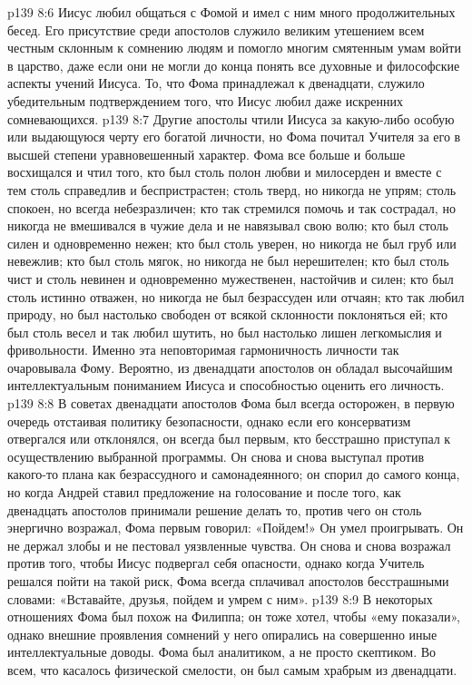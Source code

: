 \vs p139 8:6 Иисус любил общаться с Фомой и имел с ним много продолжительных бесед. Его присутствие среди апостолов служило великим утешением всем честным склонным к сомнению людям и помогло многим смятенным умам войти в царство, даже если они не могли до конца понять все духовные и философские аспекты учений Иисуса. То, что Фома принадлежал к двенадцати, служило убедительным подтверждением того, что Иисус любил даже искренних сомневающихся.
\vs p139 8:7 \pc Другие апостолы чтили Иисуса за какую\hyp{}либо особую или выдающуюся черту его богатой личности, но Фома почитал Учителя за его в высшей степени уравновешенный характер. Фома все больше и больше восхищался и чтил того, кто был столь полон любви и милосерден и вместе с тем столь справедлив и беспристрастен; столь тверд, но никогда не упрям; столь спокоен, но всегда небезразличен; кто так стремился помочь и так сострадал, но никогда не вмешивался в чужие дела и не навязывал свою волю; кто был столь силен и одновременно нежен; кто был столь уверен, но никогда не был груб или невежлив; кто был столь мягок, но никогда не был нерешителен; кто был столь чист и столь невинен и одновременно мужественен, настойчив и силен; кто был столь истинно отважен, но никогда не был безрассуден или отчаян; кто так любил природу, но был настолько свободен от всякой склонности поклоняться ей; кто был столь весел и так любил шутить, но был настолько лишен легкомыслия и фривольности. Именно эта неповторимая гармоничность личности так очаровывала Фому. Вероятно, из двенадцати апостолов он обладал высочайшим интеллектуальным пониманием Иисуса и способностью оценить его личность.
\vs p139 8:8 \pc В советах двенадцати апостолов Фома был всегда осторожен, в первую очередь отстаивая политику безопасности, однако если его консерватизм отвергался или отклонялся, он всегда был первым, кто бесстрашно приступал к осуществлению выбранной программы. Он снова и снова выступал против какого\hyp{}то плана как безрассудного и самонадеянного; он спорил до самого конца, но когда Андрей ставил предложение на голосование и после того, как двенадцать апостолов принимали решение делать то, против чего он столь энергично возражал, Фома первым говорил: «Пойдем!» Он умел проигрывать. Он не держал злобы и не пестовал уязвленные чувства. Он снова и снова возражал против того, чтобы Иисус подвергал себя опасности, однако когда Учитель решался пойти на такой риск, Фома всегда сплачивал апостолов бесстрашными словами: «Вставайте, друзья, пойдем и умрем с ним».
\vs p139 8:9 В некоторых отношениях Фома был похож на Филиппа; он тоже хотел, чтобы «ему показали», однако внешние проявления сомнений у него опирались на совершенно иные интеллектуальные доводы. Фома был аналитиком, а не просто скептиком. Во всем, что касалось физической смелости, он был самым храбрым из двенадцати.
